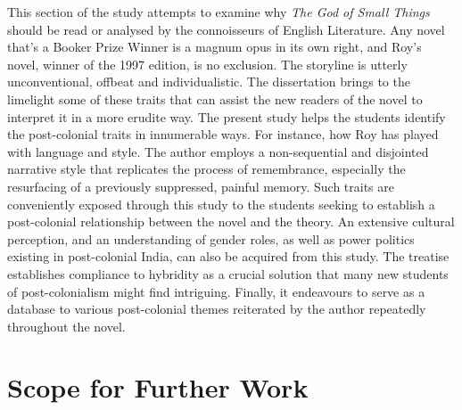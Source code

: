 This section of the study attempts to examine why \emph{The God of Small Things} should be read or analysed by the connoisseurs of English Literature. Any novel that’s a Booker Prize Winner is a magnum opus in its own right, and Roy’s novel, winner of the 1997 edition, is no exclusion. The storyline is utterly unconventional, offbeat and individualistic. The dissertation brings to the limelight some of these traits that can assist the new readers of the novel to interpret it in a more erudite way. The present study helps the students identify the post-colonial traits in innumerable ways. For instance, how Roy has played with language and style. The author employs a non-sequential and disjointed narrative style that replicates the process of remembrance, especially the resurfacing of a previously suppressed, painful memory. Such traits are conveniently exposed through this study to the students seeking to establish a post-colonial relationship between the novel and the theory. An extensive cultural perception, and an understanding of gender roles, as well as power politics existing in post-colonial India,  can also be acquired from this study. The treatise establishes compliance to hybridity as a crucial solution that many new students of post-colonialism might find intriguing. Finally, it endeavours to serve as a database to various post-colonial themes reiterated by the author repeatedly throughout the novel.

\section{Scope for Further Work}

